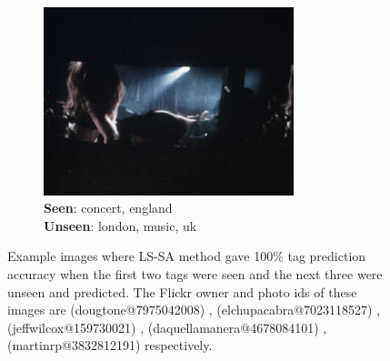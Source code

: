 \begin{figure}
\begin{subfigure}[b]{0.16\textwidth}
                \label{fig:posex4}
        \end{subfigure}%
	\; \vline
        \; %
        \begin{subfigure}[b]{0.17\textwidth}
                \includegraphics[width=0.8\textwidth]{TagTree/Flickrimg/8efd5e1c-6d83-37af-91a2-1484a9d823b3.jpeg}
                \caption{\textbf{Seen}: concert, england\\ \textbf{Unseen}: london, music, uk }
                \label{fig:posex5}
        \end{subfigure}
        \caption{Example images where LS-SA method gave 100\% tag prediction accuracy when the first two tags were seen and the next three were unseen and predicted. The Flickr owner and photo ids of these images are (dougtone@7975042008) ,  (elchupacabra@7023118527) , (jeffwilcox@159730021) , (daquellamanera@4678084101) , (martinrp@3832812191)  respectively. } \label{fig:positiveExs}
\end{figure}

